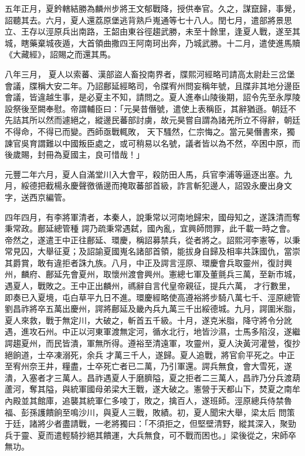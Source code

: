\begin{pinyinscope}
 五年正月，夏鈐轄結勝為麟州步將王文郁戰降，授供奉官。久之，謀竄歸，事覺，詔聽其去。六月，夏人還荔原堡逃背熟戶嵬通等七十八人。閏七月，遣部將景思立、王存以涇原兵出南路，王韶由東谷徑趨武勝，未至十餘里，逢夏人戰，遂至其城，瞎藥棄城夜遁，大首領曲撒四王阿南珂出奔，乃城武勝。十二月，遣使進馬贖《大藏經》，詔賜之而還其馬。



 八年三月，
 夏人以索蕃、漢部盜人畜投南界者，牒熙河經略司請高太尉赴三岔堡會議，牒稱大安二年。乃詔鄜延經略司，令牒宥州問妄稱年號，且牒非其地分邊臣會議，皆違越生事，是必夏主不知，請問之。夏人進奉山陵後期，詔令先至永厚陵設祭後至闕奉慰。帝謂輔臣曰：「元昊昔僭號，遣使上表稱臣，其辭猶遜。朝廷不先詰其所以然而遽絕之，縱邊民蕃部討虜，故元昊嘗自謂為諸羌所立不得辭，朝廷不得命，不得已而變。西師亟戰輒敗，
 天下騷然，仁宗悔之。當元昊僭書來，獨諫官吳育謂難以中國叛臣處之，或可稍易以名號，議者皆以為不然，卒困中原，而後歲賜，封冊為夏國主，良可惜哉！」



 元豐二年六月，夏人自滿堂川入大會平，殺防田人馬，兵官李浦等逼逐出塞。九月，綏德把截楊永慶聲徼循邊而掩取蕃部首級，詐言斬犯邊人，詔毀永慶出身文字，送西京編管。



 四年四月，有李將軍清者，本秦人，說秉常以河南地歸宋，國母知之，遂誅清而奪秉常政。鄜延總管種
 諤乃疏秉常遇弑，國內亂，宜興師問罪，此千載一時之會。帝然之，遂遣王中正往鄜延、環慶，稱詔募禁兵，從者將之。詔熙河李憲等，以秉常見囚，大舉征夏；及詔諭夏國嵬名諸部首領，能拔身自歸及相率共誅國仇，當崇其爵賞，敢有違拒者誅九族。八月，中正及諤言涇原、環慶會兵取靈州，復討興州，麟府、鄜延先會夏州，取懷州渡會興州。憲總七軍及董氈兵三萬，至新市城，遇夏人，戰敗之。王中正出麟州，禡辭自言代皇帝親征，提兵六萬，
 才行數里，即奏已入夏境，屯白草平九日不進。環慶經略使高遵裕將步騎八萬七千、涇原總管劉昌祚將卒五萬出慶州，諤將鄜延及畿內兵九萬三千出綏德城。九月，諤圍米脂，夏人來救，戰于無定川，大破之，斬首五千級。十月，遂克米脂，降守將令分訛遇，進攻石州。中正以河東軍渡無定河，循水北行，地皆沙濕，士馬多陷沒，遂繼諤趨夏州，而民皆潰，軍無所得。遵裕至清遠軍，攻靈州，夏人決黃河灌營，復抄絕餉道，士卒凍溺死，余兵
 才萬三千人，遂歸。夏人追戰，將官俞平死之。中正至宥州奈王井，糧盡，士卒死亡者已二萬，乃引軍還。諤兵無食，會大雪死，遂潰，入塞者才三萬人。昌祚遇夏人于磨臍隘，夏之拒者二三萬人，昌祚乃分兵渡葫蘆河，奪其隘，與統軍國母弟梁大王戰，遂大破之。憲營于天都山下，焚夏之南牟內殿並其館庫，追襲其統軍仁多㖫丁，敗之，擒百人，遂班師。涇原總兵侍禁魯福、彭孫護饋餉至鳴沙川，與夏人三戰，敗績。初，夏人聞宋大舉，梁太后
 問策于廷，諸將少者盡請戰，一老將獨曰：「不須拒之，但堅壁清野，縱其深入，聚勁兵于靈、夏而遣輕騎抄絕其饋運，大兵無食，可不戰而困也。」梁後從之，宋師卒無功。




\end{pinyinscope}
